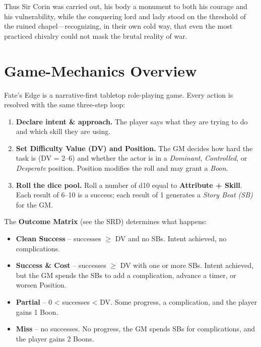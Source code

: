 \documentclass[11pt,twoside]{book}
\begin{document}
Thus Sir Corin was carried out, his body a monument to both his courage and his vulnerability, while the conquering lord and lady stood on the threshold of the ruined chapel---recognizing, in their own cold way, that even the most practiced chivalry could not mask the brutal reality of war.


\tableofcontents
\newpage

\chapter{Game-Mechanics Overview}
\label{ch:mechanics}

Fate's Edge is a narrative-first tabletop role-playing game.  Every action is resolved with the same three-step loop:

\begin{enumerate}
  \item \textbf{Declare intent \& approach.}  The player says what they are trying to do and which skill they are using.
  \item \textbf{Set Difficulty Value (DV) and Position.}  The GM decides how hard the task is (DV = 2--6) and whether the actor is in a \emph{Dominant}, \emph{Controlled}, or \emph{Desperate} position.  Position modifies the roll and may grant a \emph{Boon}.
  \item \textbf{Roll the dice pool.}  Roll a number of d10 equal to \textbf{Attribute + Skill}.  Each result of 6--10 is a success; each result of 1 generates a \emph{Story Beat (SB)} for the GM.
\end{enumerate}

The \textbf{Outcome Matrix} (see the SRD) determines what happens:

\begin{itemize}
  \item \textbf{Clean Success} -- successes $\geq$ DV and no SBs.  Intent achieved, no complications.
  \item \textbf{Success \& Cost} -- successes $\geq$ DV with one or more SBs.  Intent achieved, but the GM spends the SBs to add a complication, advance a timer, or worsen Position.
  \item \textbf{Partial} -- 0 < successes < DV.  Some progress, a complication, and the player gains 1 Boon.
  \item \textbf{Miss} -- no successes.  No progress, the GM spends SBs for complications, and the player gains 2 Boons.
\end{itemize}
\end{document}

